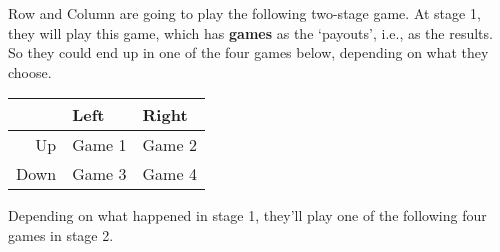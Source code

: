 
\def\mytitle{Subgame Perfect Equilibrium}
\def\myauthor{Brian Weatherson}
\def\mydate{February 8, 2018}


Row and Column are going to play the following two-stage game. At stage 1, they will play this game, which has \textbf{games} as the `payouts', i.e., as the results. So they could end up in one of the four games below, depending on what they choose.

\begin{minipage}{\linewidth}
\setlength{\tymax}{0.5\linewidth}
\centering
\small
\begin{tabulary}{\textwidth}{@{}rll@{}} \toprule
 & Left & Right \\
\midrule

 Up & Game 1 & Game 2 \\
 Down & Game 3 & Game 4 \\
\bottomrule

\end{tabulary}
\end{minipage}

\bigskip
\bigskip
Depending on what happened in stage 1, they'll play one of the following four games in stage 2.

